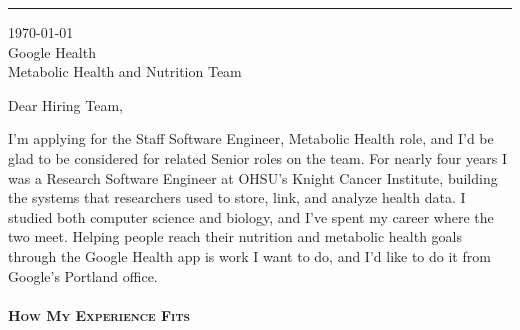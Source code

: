 
\newcommand{\docfontsize}{10pt}



{\color{my-grey-light}\rule{\linewidth}{0.5pt}}
\bigbreak

{\today}\\
Google Health\\
Metabolic Health and Nutrition Team

\vspace*{0.6\baselineskip}

Dear Hiring Team,

\vspace*{0.3\baselineskip}

I'm applying for the Staff Software Engineer, Metabolic Health role, and I'd be glad to be considered for related Senior roles on the team.
For nearly four years I was a Research Software Engineer at OHSU's Knight Cancer Institute, building the systems that researchers used to store, link, and analyze health data.
I studied both computer science and biology, and I've spent my career where the two meet.
Helping people reach their nutrition and metabolic health goals through the Google Health app is work I want to do, and I'd like to do it from Google's Portland office.


\paragraph{\textbf{\scshape How My Experience Fits}}\

\vspace*{0.3\baselineskip}

